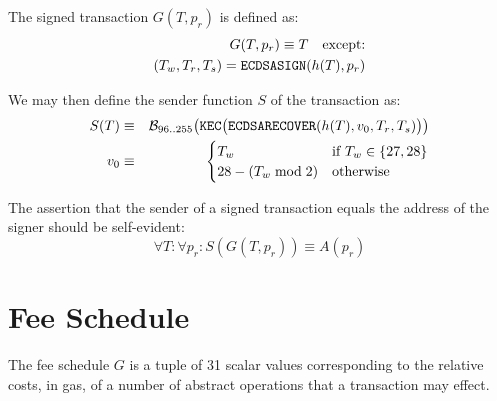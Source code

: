 \documentclass[9pt,oneside]{amsart}
\begin{document}
The signed transaction $G(T, p_r)$ is defined as:
\begin{eqnarray}
G(T, p_r) \equiv T \quad \text{except:} \\
(T_w, T_r, T_s) = \mathtt{\small ECDSASIGN}(h(T), p_r)
\end{eqnarray}

We may then define the sender function $S$ of the transaction as:
\begin{eqnarray}
S(T) &\equiv& \mathcal{B}_{96..255}\big(\mathtt{\tiny KEC}\big( \mathtt{\small ECDSARECOVER}(h(T), v_0, T_r, T_s) \big) \big) \\
v_0 &\equiv& \begin{cases}
T_w &\text{if}\ T_w\in\{27, 28\} \\
28 - (T_w \bmod 2) &\text{otherwise}
\end{cases}
\end{eqnarray}

The assertion that the sender of a signed transaction equals the address of the signer should be self-evident:
\begin{equation}
\forall T: \forall p_r: S(G(T, p_r)) \equiv A(p_r)
\end{equation}

\section{Fee Schedule}\label{app:fees}

The fee schedule $G$ is a tuple of 31 scalar values corresponding to the relative costs, in gas, of a number of abstract operations that a transaction may effect.
\end{document}
